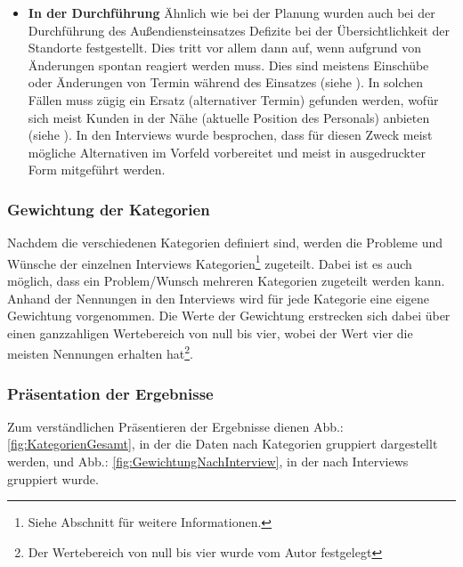 \documentclass[Bachelorarbeit.tex]{subfiles}
\begin{document}
\begin{itemize}
Die Grenze der zumutbaren Übersicht wird erreicht, wenn geografische Informationen mit weiteren Faktoren, wie Kundendaten, in Kontext gesetzt werden sollen. 
Dies wird aktuell in einzelnen Zwischenschritten\footnote{Dabei ist die Anzahl der Zwischenschritte von der Anzahl der benötigten Faktoren abhängig} gelöst und ist dadurch zum einen fehleranfällig und zum anderen zeitaufwendig (siehe ).

\item \textbf{In der Durchführung}
Ähnlich wie bei der Planung wurden auch bei der Durchführung des Außendiensteinsatzes Defizite bei der Übersichtlichkeit der Standorte festgestellt. 
Dies tritt vor allem dann auf, wenn aufgrund von Änderungen spontan reagiert werden muss.
Dies sind meistens Einschübe oder Änderungen von Termin während des Einsatzes (siehe ). 
In solchen Fällen muss zügig ein Ersatz (alternativer Termin) gefunden werden, wofür sich meist Kunden in der Nähe (aktuelle Position des Personals) anbieten (siehe ).
In den Interviews wurde besprochen, dass für diesen Zweck meist mögliche Alternativen im Vorfeld vorbereitet und meist in ausgedruckter Form mitgeführt werden. 
\end{itemize}

\subsubsection{Gewichtung der Kategorien}
\label{analyse:gewichtung}

Nachdem die verschiedenen Kategorien definiert sind, werden die Probleme und Wünsche der einzelnen Interviews Kategorien\footnote{
	Siehe Abschnitt  für weitere Informationen.
	}
zugeteilt.
Dabei ist es auch möglich, dass ein Problem/Wunsch mehreren Kategorien zugeteilt werden kann.
Anhand der Nennungen in den Interviews wird für jede Kategorie eine eigene Gewichtung vorgenommen.
Die Werte der Gewichtung erstrecken sich dabei über einen ganzzahligen Wertebereich von null bis vier, wobei der Wert vier die meisten Nennungen erhalten hat\footnote
{Der Wertebereich von null bis vier wurde vom Autor festgelegt}.

\subsubsection{Präsentation der Ergebnisse}

Zum verständlichen Präsentieren der Ergebnisse dienen Abb.: \ref{fig:KategorienGesamt}, in der die Daten nach Kategorien gruppiert dargestellt werden, und Abb.: \ref{fig:GewichtungNachInterview}, in der nach Interviews gruppiert wurde. 
\end{document}
